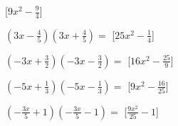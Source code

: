 \begin{esercizio}
\begin{multicols}{2}
\begin{enumeratea}
  \hfill [\(9 x^{2} - \frac{9}{4}\)]
\item \(\left(3 x - \frac{4}{5}\right)\left(3 x + \frac{4}{5}\right)=\)
  \hfill [\(25 x^{2} - \frac{1}{4}\)]
\item \(\left(- 3 x + \frac{3}{2}\right)\left(- 3 x - \frac{3}{2}\right)=\)
  \hfill [\(16 x^{2} - \frac{25}{9}\)]
\item \(\left(- 5 x + \frac{1}{3}\right)\left(- 5 x - \frac{1}{3}\right)=\)
  \hfill [\(9 x^{2} - \frac{16}{25}\)]
\item \(\left(- \frac{3 x}{5} + 1\right)\left(- \frac{3 x}{5} - 1\right)=\)
  \hfill [\(\frac{9 x^{2}}{25} - 1\)]
\end{enumeratea}
\end{multicols}
\end{esercizio}


